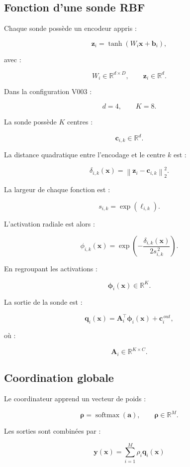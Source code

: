 \documentclass[11pt,a4paper]{article}
\begin{document}
\subsection{Fonction d'une sonde RBF}

Chaque sonde possède un encodeur appris :

\[
  \bm{z}_i
  =
  \tanh(W_i\bm{x}+\bm{b}_i),
\]

avec :

\[
  W_i\in\mathbb{R}^{d\times D},
  \qquad
  \bm{z}_i\in\mathbb{R}^{d}.
\]

Dans la configuration V003 :

\[
  d=4,\qquad K=8.
\]

La sonde possède \(K\) centres :

\[
  \bm{c}_{i,k}\in\mathbb{R}^{d}.
\]

La distance quadratique entre l'encodage et le centre \(k\) est :

\[
  \delta_{i,k}(\bm{x})
  =
  \left\|
    \bm{z}_i-\bm{c}_{i,k}
  \right\|_2^2.
\]

La largeur de chaque fonction est :

\[
  s_{i,k}=\exp(\ell_{i,k}).
\]

L'activation radiale est alors :

\[
  \phi_{i,k}(\bm{x})
  =
  \exp\left(
    -\frac{
      \delta_{i,k}(\bm{x})
    }{
      2s_{i,k}^{\,2}
    }
  \right).
\]

En regroupant les activations :

\[
  \bm{\phi}_i(\bm{x})
  \in\mathbb{R}^{K}.
\]

La sortie de la sonde est :

\[
  \bm{q}_i(\bm{x})
  =
  \bm{A}_i^\top\bm{\phi}_i(\bm{x})
  +\bm{c}_i^{\,out},
\]

où :

\[
  \bm{A}_i\in\mathbb{R}^{K\times C}.
\]

\subsection{Coordination globale}

Le coordinateur apprend un vecteur de poids :

\[
  \bm{\rho}
  =
  \operatorname{softmax}(\bm{a}),
  \qquad
  \bm{\rho}\in\mathbb{R}^{M}.
\]

Les sorties sont combinées par :

\[
  \boxed{
  \bm{y}(\bm{x})
  =
  \sum_{i=1}^{M}
  \rho_i\bm{q}_i(\bm{x})
  }
\]
\end{document}
